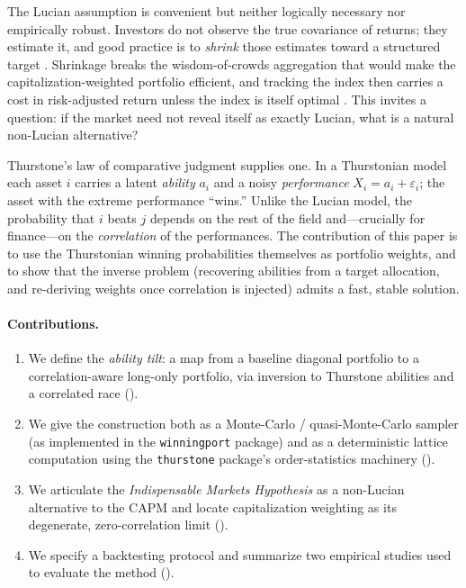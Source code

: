 \documentclass[11pt]{article}
\begin{document}
The Lucian assumption is convenient but neither logically necessary nor
empirically robust. Investors do not observe the true covariance of returns;
they estimate it, and good practice is to \emph{shrink} those estimates toward a
structured target \parencite{ledoitwolf2004}. Shrinkage breaks the
wisdom-of-crowds aggregation that would make the capitalization-weighted
portfolio efficient, and tracking the index then carries a cost in
risk-adjusted return unless the index is itself optimal \parencite{roll1992}.
This invites a question: if the market need not reveal itself as exactly Lucian,
what is a natural non-Lucian alternative?

Thurstone's law of comparative judgment \parencite{thurstone1927} supplies one.
In a Thurstonian model each asset $i$ carries a latent \emph{ability} $a_i$ and a
noisy \emph{performance} $X_i = a_i + \varepsilon_i$; the asset with the extreme
performance ``wins.'' Unlike the Lucian model, the probability that $i$ beats $j$
depends on the rest of the field and---crucially for finance---on the
\emph{correlation} of the performances. The contribution of this paper is to use
the Thurstonian winning probabilities themselves as portfolio weights, and to
show that the inverse problem (recovering abilities from a target allocation, and
re-deriving weights once correlation is injected) admits a fast, stable solution.

\paragraph{Contributions.}
\begin{enumerate}
  \item We define the \emph{ability tilt}: a map from a baseline diagonal
        portfolio to a correlation-aware long-only portfolio, via inversion to
        Thurstone abilities and a correlated race ().
  \item We give the construction both as a Monte-Carlo / quasi-Monte-Carlo
        sampler (as implemented in the \texttt{winningport} package) and as a
        deterministic lattice computation using the \texttt{thurstone} package's
        order-statistics machinery ().
  \item We articulate the \emph{Indispensable Markets Hypothesis} as a
        non-Lucian alternative to the CAPM and locate capitalization weighting
        as its degenerate, zero-correlation limit ().
  \item We specify a backtesting protocol and summarize two empirical studies
        used to evaluate the method ().
\end{enumerate}
\end{document}
